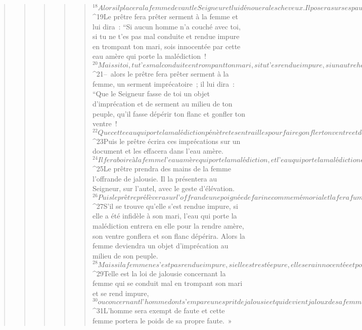 \begin{verse}
\begin{verse}
\begin{verse}
\begin{verse}
\begin{verse}
${}^{18}Alors il placera la femme devant le Seigneur et lui dénouera les cheveux. Il posera sur ses paumes l’offrande en mémorial – c’est une offrande de jalousie –, et lui-même aura dans ses mains l’eau amère qui porte la malédiction.
${}^{19}Le prêtre fera prêter serment à la femme et lui dira : “Si aucun homme n’a couché avec toi, si tu ne t’es pas mal conduite et rendue impure en trompant ton mari, sois innocentée par cette eau amère qui porte la malédiction ! 
${}^{20}Mais si toi, tu t’es mal conduite en trompant ton mari, si tu t’es rendue impure, si un autre homme que ton mari a eu des rapports sexuels avec toi…” 
${}^{21}– alors le prêtre fera prêter serment à la femme, un serment imprécatoire ; il lui dira : “Que le Seigneur fasse de toi un objet d’imprécation et de serment au milieu de ton peuple, qu’il fasse dépérir ton flanc et gonfler ton ventre ! 
${}^{22}Que cette eau qui porte la malédiction pénètre tes entrailles pour faire gonfler ton ventre et dépérir ton flanc !” Et la femme dira : “Amen ! Amen !”
${}^{23}Puis le prêtre écrira ces imprécations sur un document et les effacera dans l’eau amère. 
${}^{24}Il fera boire à la femme l’eau amère qui porte la malédiction, et l’eau qui porte la malédiction entrera en elle pour la rendre amère. 
${}^{25}Le prêtre prendra des mains de la femme l’offrande de jalousie. Il la présentera au Seigneur, sur l’autel, avec le geste d’élévation. 
${}^{26}Puis le prêtre prélèvera sur l’offrande une poignée de farine comme mémorial et la fera fumer sur l’autel ; c’est alors qu’il fera boire l’eau à la femme. 
${}^{27}S’il se trouve qu’elle s’est rendue impure, si elle a été infidèle à son mari, l’eau qui porte la malédiction entrera en elle pour la rendre amère, son ventre gonflera et son flanc dépérira. Alors la femme deviendra un objet d’imprécation au milieu de son peuple. 
${}^{28}Mais si la femme ne s’est pas rendue impure, si elle est restée pure, elle sera innocentée et pourra être féconde.
${}^{29}Telle est la loi de jalousie concernant la femme qui se conduit mal en trompant son mari et se rend impure, 
${}^{30}ou concernant l’homme dont s’empare un esprit de jalousie et qui devient jaloux de sa femme. Celui-ci placera sa femme devant le Seigneur, et le prêtre accomplira pour elle toute cette loi. 
${}^{31}L’homme sera exempt de faute et cette femme portera le poids de sa propre faute. »
      

\end{verse}
\end{verse}
\end{verse}
\end{verse}
\end{verse}
